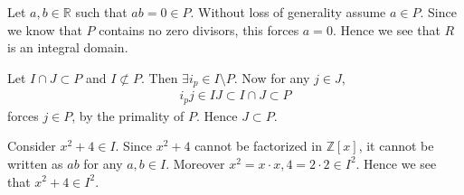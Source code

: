 \documentclass[12pt]{exam}
\theoremstyle{plain} %
\theoremstyle{definition} %
\theoremstyle{remark} %
\begin{document}
\begin{questions}
\begin{solution}
  \end{solution}

  \question
  \begin{solution}
    Let $a, b \in \mathbb{R}$ such that $ab = 0 \in P$. Without loss
    of generality assume $a \in P$. Since we know that $P$
    contains no zero divisors, this forces $a = 0$. Hence we see that
    $R$ is an integral domain.
  \end{solution}

  \question
  \begin{solution}
    Let $I \cap J \subset P$ and $I \not \subset P$. Then $\exists
    i_p \in I\setminus P$. Now for any $j \in J$,
    \begin{align*}
      i_pj \in IJ \subset I \cap J \subset P
    \end{align*}
    forces $j \in P$, by the primality of $P$. Hence $J \subset P$.
  \end{solution}

  \question
  \begin{solution}
    Consider $x^2 + 4 \in I$. Since $x^2 + 4$ cannot be factorized in
    $\mathbb{Z}[x]$, it cannot be written as $ab$ for any $a, b \in
    I$. Moreover $x^2 = x\cdot x, 4 = 2\cdot2 \in I^2$. Hence we see
    that $x^2 + 4 \in I^2$.
  \end{solution}


\end{questions}
\end{document}
